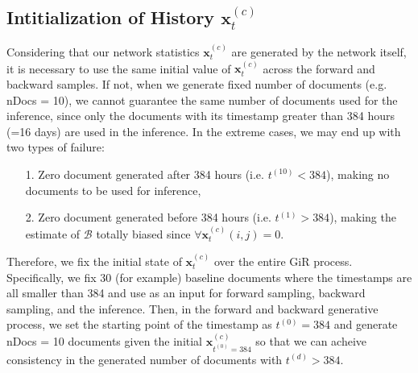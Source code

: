 \documentclass[a4paper]{article}
\begin{document}
      \subsection{Intitialization of History $\boldsymbol{x}_t^{(c)}$} \label{subsubsec: Initial history issue}
      Considering that our network statistics $\boldsymbol{x}_t^{(c)}$ are generated by the network itself, it is necessary to use the same initial value of $\boldsymbol{x}_t^{(c)}$ across the forward and backward samples. If not, when we generate fixed number of documents (e.g. nDocs = 10), we cannot guarantee the same number of documents used for the inference, since only the documents with its timestamp greater than 384 hours (=16 days) are used in the inference. In the extreme cases, we may end up with two types of failure:
      \begin{itemize}
      	\item[1.] Zero document generated after 384 hours (i.e. $t^{(10)} < 384$), making no documents to be used for inference,
      	\item[2.] Zero document generated before 384 hours (i.e. $t^{(1)} > 384$), making the estimate of $\mathcal{B}$ totally biased since $\forall  \boldsymbol{x}_t^{(c)}(i, j) = 0$. 
      \end{itemize}
      Therefore, we fix the initial state of $\boldsymbol{x}_t^{(c)}$ over the entire GiR process. Specifically, we fix 30 (for example) baseline documents where the timestamps are all smaller than 384 and use as an input for forward sampling, backward sampling, and the inference. Then, in the forward and backward generative process, we set the starting point of the timestamp as $t^{(0)} = 384$ and generate nDocs = 10 documents given the initial $\boldsymbol{x}_{t^{(0)} = 384}^{(c)}$ so that we can acheive consistency in the generated number of documents with $t^{(d)} > 384$.
\end{document}
